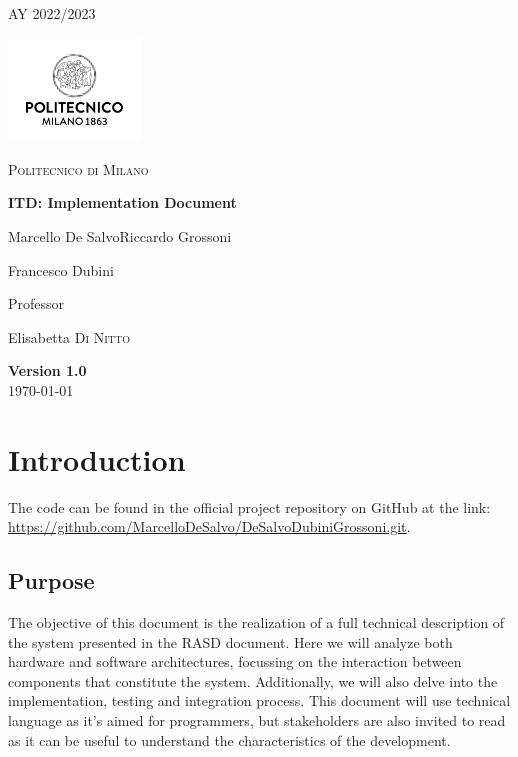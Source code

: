 \documentclass[table, 12pt]{article}
\begin{document}
\begin{titlepage}
    \centering
    {\scshape\large AY 2022/2023 \par}
    \vfill
    \includegraphics[width=100pt]{assets/logo_polimi.jpg}\par\vspace{1cm}
    {\scshape\LARGE Politecnico di Milano \par}
    \vspace{1.5cm}
    {\huge\bfseries ITD\@: Implementation Document \par}
    \vspace{2cm}
    {\Large {Marcello De Salvo\quad Riccardo Grossoni \par Francesco Dubini}\par}
    \vfill
    {\large Professor\par
        Elisabetta \textsc{Di Nitto}}
    \vfill
    {\large \textbf{Version 1.0}\\ \today \par}
\end{titlepage}


\thispagestyle{plain}
\mbox{}
\newpage
{}
\tableofcontents
\newpage
{}

\section{Introduction}
The code can be found in the official project repository on GitHub at the link:
\url{https://github.com/MarcelloDeSalvo/DeSalvoDubiniGrossoni.git}.

\subsection{Purpose}

The objective of this document is the realization of a full technical description of the system presented in the RASD document.
Here we will analyze both hardware and software architectures, focussing on the interaction between components that constitute the system.
Additionally, we will also delve into the implementation, testing and integration process.
This document will use technical language as it's aimed for programmers, but stakeholders are also invited to read as it can be useful to understand the characteristics of the development.
\end{document}
